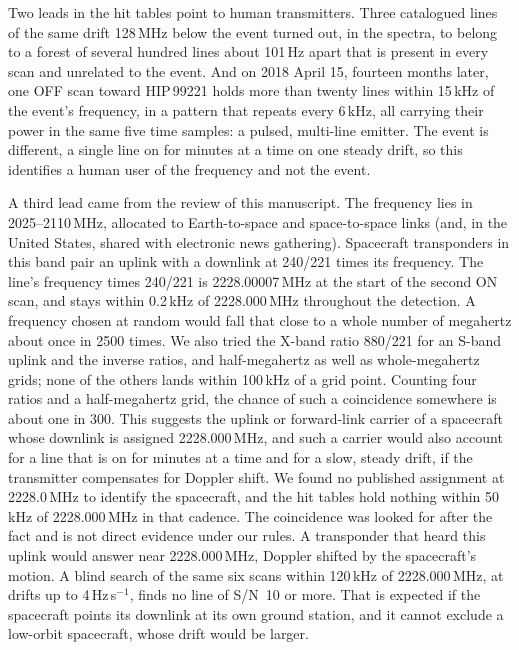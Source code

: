 \documentclass[twocolumn]{aastex631}
\newcommand{\hzs}{Hz\,s$^{-1}$}
\newcommand{\sn}{S/N}
\begin{document}
Two leads in the hit tables point to human transmitters. Three catalogued
lines of the same drift 128\,MHz below the event turned out, in the
spectra, to belong to a forest of several hundred lines about 101\,Hz apart
that is present in every scan and unrelated to the event. And on 2018 April
15, fourteen months later, one OFF scan toward HIP\,99221 holds more than
twenty lines within 15\,kHz of the event's frequency, in a pattern that
repeats every 6\,kHz, all carrying their power in the same five time
samples: a pulsed, multi-line emitter. The event is different, a single
line on for minutes at a time on one steady drift, so this identifies a
human user of the frequency and not the event.

A third lead came from the review of this manuscript. The frequency lies in
2025--2110\,MHz, allocated to Earth-to-space and space-to-space links (and,
in the United States, shared with electronic news gathering). Spacecraft
transponders in this band pair an uplink with a downlink at 240/221 times
its frequency. The line's frequency times 240/221 is 2228.00007\,MHz at the
start of the second ON scan, and stays within 0.2\,kHz of 2228.000\,MHz
throughout the detection. A frequency chosen at random would fall that
close to a whole number of megahertz about once in 2500 times. We also
tried the X-band ratio 880/221 for an S-band uplink and the inverse ratios,
and half-megahertz as well as whole-megahertz grids; none of the others
lands within 100\,kHz of a grid point. Counting four ratios and a
half-megahertz grid, the chance of such a coincidence somewhere is about
one in 300. This
suggests the uplink or forward-link carrier of a spacecraft whose downlink
is assigned 2228.000\,MHz, and such a carrier would also account for a line
that is on for minutes at a time and for a slow, steady drift, if the
transmitter compensates for Doppler shift. We found no published assignment
at 2228.0\,MHz to identify the spacecraft, and the hit tables hold nothing
within 50\,kHz of 2228.000\,MHz in that cadence. The coincidence was looked
for after the fact and is not direct evidence under our rules. A
transponder that heard this uplink would answer near 2228.000\,MHz, Doppler
shifted by the spacecraft's motion. A blind search of the same six scans
within 120\,kHz of 2228.000\,MHz, at drifts up to 4\,\hzs, finds no line of
\sn\ 10 or more. That is expected if the spacecraft points its downlink at
its own ground station, and it cannot exclude a low-orbit spacecraft, whose
drift would be larger.
\end{document}
